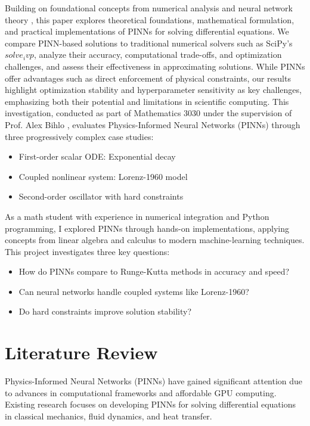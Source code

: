 \documentclass{article}
\begin{document}
Building on foundational concepts from numerical analysis \cite{heath2018scientific} and neural network theory \cite{MATH2030}, this paper explores theoretical foundations, mathematical formulation, and practical implementations of PINNs for solving differential equations. We compare PINN-based solutions to traditional numerical solvers such as SciPy's $solve_ivp$, analyze their accuracy, computational trade-offs, and optimization challenges, and assess their effectiveness in approximating solutions. While PINNs offer advantages such as direct enforcement of physical constraints, our results highlight optimization stability and hyperparameter sensitivity as key challenges, emphasizing both their potential and limitations in scientific computing.
This investigation, conducted as part of Mathematics 3030 under the supervision of Prof. Alex Bihlo \cite{bihlo2023pinn}, evaluates Physics-Informed Neural Networks (PINNs) through three progressively complex case studies:
\begin{itemize}
\item First-order scalar ODE: Exponential decay
\item Coupled nonlinear system: Lorenz-1960 model
\item Second-order oscillator with hard constraints
\end{itemize}

As a math student with experience in numerical integration and Python programming, I explored PINNs through hands-on implementations, applying concepts from linear algebra and calculus to modern machine-learning techniques. This project investigates three key questions:
\begin{itemize}
\item How do PINNs compare to Runge-Kutta methods in accuracy and speed?
\item Can neural networks handle coupled systems like Lorenz-1960?
\item Do hard constraints improve solution stability?
\end{itemize}
\section{Literature Review}
Physics-Informed Neural Networks (PINNs) have gained significant attention due to advances in computational frameworks and affordable GPU computing. Existing research focuses on developing PINNs for solving differential equations in classical mechanics, fluid dynamics, and heat transfer.
\end{document}
